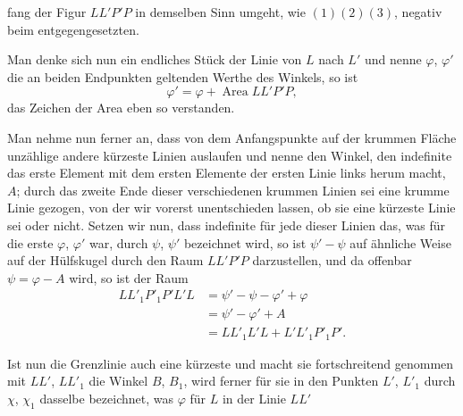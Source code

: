 %
fang der Figur $LL'P'P$ in demselben Sinn umgeht, wie $(1)(2)(3)$, negativ beim entgegengesetzten.
\begin{center}
\hfill\hfill
\end{center}
\noindent\hspace*{1.2em}Man denke sich nun ein endliches Stück der Linie von $L$ nach $L'$ und nenne $\varphi$, $\varphi'$ die an beiden Endpunkten geltenden Werthe des Winkels, so ist
\[
\varphi'=\varphi+\operatorname{Area}LL'P'P,
\]
das Zeichen der Area eben so verstanden.

Man nehme nun ferner an, dass von dem Anfangspunkte auf der krummen Fläche unzählige andere kürzeste Linien auslaufen und nenne den Winkel, den indefinite das erste Element mit dem ersten Elemente der ersten Linie links herum macht, $A$; durch das zweite Ende dieser verschiedenen krummen Linien sei eine krumme Linie gezogen, von der wir vorerst unentschieden lassen, ob sie eine kürzeste Linie sei oder nicht. Setzen wir nun, dass indefinite für jede dieser Linien das, was für die erste $\varphi$, $\varphi'$ war, durch $\psi$, $\psi'$ bezeichnet wird, so ist $\psi'-\psi$ auf ähnliche Weise auf der Hülfskugel durch den Raum $LL'P'P$ darzustellen, und da offenbar $\psi=\varphi-A$ wird, so ist der Raum
\[
\begin{aligned}
LL'_1P'_1P'L'L&=\psi'-\psi-\varphi'+\varphi\\
&=\psi'-\varphi'+A\\
&=LL'_1L'L+L'L'_1P'_1P'.
\end{aligned}
\]
\begin{center}\end{center}
\noindent\hspace*{1.2em}Ist nun die Grenzlinie auch eine kürzeste und macht sie fortschreitend genommen mit $LL'$, $LL'_1$ die Winkel $B$, $B_1$, wird ferner für sie in den Punkten $L'$, $L'_1$ durch $\chi$, $\chi_1$ dasselbe bezeichnet, was $\varphi$ für $L$ in der Linie $LL'$
